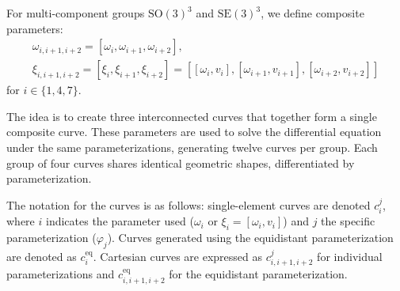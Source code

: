 For multi-component groups \(\mathrm{SO}(3)^3\) and \(\mathrm{SE}(3)^3\), we define composite parameters:
\begin{gather}
    \omega_{i, i+1, i+2} = [\omega_i, \omega_{i+1}, \omega_{i+2}], \nonumber \\
    \xi_{i, i+1, i+2} = \left[ \xi_i, \xi_{i+1}, \xi_{i+2} \right] = \left[ [\omega_i, v_i], [\omega_{i+1}, v_{i+1}], [\omega_{i+2}, v_{i+2}] \right] 
\end{gather}
for \(i \in \{1, 4, 7\}\).

The idea is to create three interconnected curves that together form a single composite curve. These parameters are used to solve the differential equation under the same parameterizations, generating twelve curves per group. Each group of four curves shares identical geometric shapes, differentiated by parameterization.

The notation for the curves is as follows: single-element curves are denoted \(c_i^j\), where \(i\) indicates the parameter used (\(\omega_i\) or \(\xi_i = [\omega_i, v_i]\)) and \(j\) the specific parameterization (\(\varphi_j\)). Curves generated using the equidistant parameterization are denoted as \(c_i^{\text{eq}}\). Cartesian curves are expressed as \(c_{i, i+1, i+2}^j\) for individual parameterizations and \(c_{i, i+1, i+2}^{\text{eq}}\) for the equidistant parameterization.
